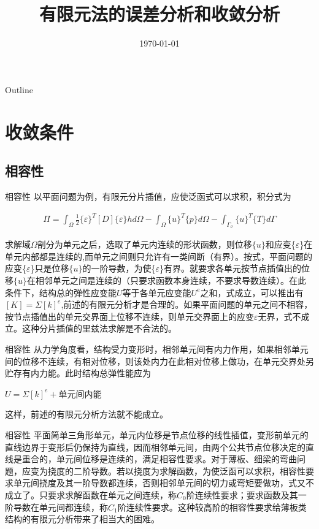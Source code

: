 \documentclass[11pt]{beamer}
\begin{document}
\author{}
\title[有限元解的性质和收敛准则]{有限元法的误差分析和收敛分析}
\subtitle{}
\date{\today}
\frame[plain]{\maketitle}

\begin{frame}{Outline}
\tableofcontents %
\end{frame}

\section{收敛条件}
\subsection{相容性}
\begin{frame}{相容性}
以平面问题为例，有限元分片插值，应使泛函式可以求积，积分式为

\begin{align*}
\Pi=\int_\Omega\frac{1}{2}\{\varepsilon\}^{T}[D]\{\varepsilon\}hd\Omega-\int_\Omega \{u\}^{T}\{p\}d\Omega-\int_\Gamma_{\sigma} \{u\}^{T}\{T\}d\Gamma
\end{align*}

求解域$\Omega$剖分为单元之后，选取了单元内连续的形状函数，则位移$\{u\}$和应变\{$\varepsilon$\}在单元内部都是连续的,而单元之间则只允许有一类间断（有界）。按式，平面问题的应变\{$\varepsilon$\}只是位移$\{u\}$的一阶导数，为使\{$\varepsilon$\}有界。就要求各单元按节点插值出的位移$\{u\}$在相邻单元之间是连续的（只要求函数本身连续，不要求导数连续）。在此条件下，结构总的弹性应变能$U$等于各单元应变能$U^{e}$之和，式成立，可以推出有$[K]=\Sigma [k]^{e}$,前述的有限元分析才是合理的。如果平面问题的单元之间不相容，按节点插值出的单元交界面上位移不连续，则单元交界面上的应变$\varepsilon$无界，式不成立。这种分片插值的里兹法求解是不合法的。

\end{frame}


\begin{frame}{相容性}
从力学角度看，结构受力变形时，相邻单元间有内力作用，如果相邻单元间的位移不连续，有相对位移，则该处内力在此相对位移上做功，在单元交界处另贮存有内力能。此时结构总弹性能应为
\par
$U=\Sigma[k]^{e}+$单元间内能
\par
这样，前述的有限元分析方法就不能成立。
\end{frame}

\begin{frame}{相容性}	
平面简单三角形单元，单元内位移是节点位移的线性插值，变形前单元的直线边界于变形后仍保持为直线，因而相邻单元间，由两个公共节点位移决定的直线是重合的，单元间位移是连续的，满足相容性要求。对于薄板、细梁的弯曲问题，应变为挠度的二阶导数。若以挠度为求解函数，为使泛函可以求积，相容性要求单元间挠度及其一阶导数都连续，否则相邻单元间的切力或弯矩要做功，式又不成立了。只要求求解函数在单元之间连续，称$C_{0}$阶连续性要求；要求函数及其一阶导数在单元间都连续，称$C_{1}$阶连续性要求。这种较高阶的相容性要求给薄板类结构的有限元分析带来了相当大的困难。
\end{frame}
\end{document}
